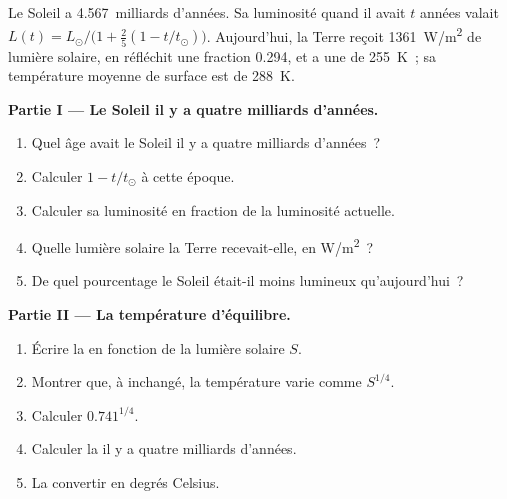 \begin{problem}
\label{pb:g12:early-earth:1}
Le Soleil a \num{4.567}~milliards d'années. Sa luminosité quand il avait
$t$ années valait $L(t) = L_\odot/\bigl(1 + \tfrac25 (1 - t/t_\odot)\bigr)$.
Aujourd'hui, la Terre reçoit \qty{1361}{W/m^2} de lumière solaire, en
réfléchit une fraction 0.294, et a une  de
\qty{255}{K}~; sa température moyenne de surface est de \qty{288}{K}.

\medskip
\noindent\textbf{Partie I --- Le Soleil il y a quatre milliards d'années.}
\begin{enumerate}
  \item Quel âge avait le Soleil il y a quatre milliards d'années~?
  \item Calculer $1 - t/t_\odot$ à cette époque.
  \item Calculer sa luminosité en fraction de la luminosité actuelle.
  \item Quelle lumière solaire la Terre recevait-elle, en \unit{W/m^2}~?
  \item De quel pourcentage le Soleil était-il moins lumineux
        qu'aujourd'hui~?
\end{enumerate}

\medskip
\noindent\textbf{Partie II --- La température d'équilibre.}
\begin{enumerate}[resume]
  \item Écrire la  en fonction de la lumière
        solaire $S$.
  \item Montrer que, à  inchangé, la température varie comme
        $S^{1/4}$.
  \item Calculer $0.741^{1/4}$.
  \item Calculer la  il y a quatre milliards
        d'années.
  \item La convertir en degrés Celsius.
\end{enumerate}


\end{problem}
